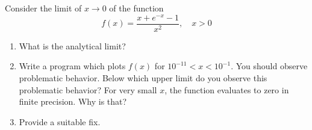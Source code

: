     Consider the limit of $x \to 0$ of the function
    \begin{equation}
        f(x) = \frac{x + e^{-x} - 1}{x^2}, \quad x > 0
    \end{equation}

    \begin{enumerate}
        \item What is the analytical limit?
        \item Write a program which plots $f(x)$ for $10^{-11} < x < 10^{-1}$. You should observe problematic behavior. 
        Below which upper limit do you observe this problematic behavior? For very small $x$, the function evaluates
        to zero in finite precision. Why is that?
        \item Provide a suitable fix.
    \end{enumerate}


